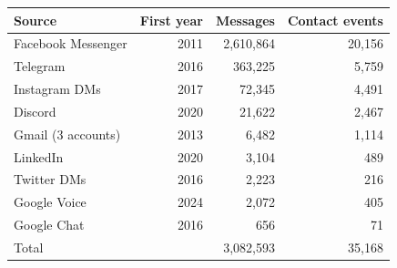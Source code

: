 \begin{tabular}{lrrr}\toprule
Source & First year & Messages & Contact events\\\midrule
Facebook Messenger & 2011 & 2,610,864 & 20,156\\
Telegram & 2016 & 363,225 & 5,759\\
Instagram DMs & 2017 & 72,345 & 4,491\\
Discord & 2020 & 21,622 & 2,467\\
Gmail (3 accounts) & 2013 & 6,482 & 1,114\\
LinkedIn & 2020 & 3,104 & 489\\
Twitter DMs & 2016 & 2,223 & 216\\
Google Voice & 2024 & 2,072 & 405\\
Google Chat & 2016 & 656 & 71\\
\midrule
Total & & 3,082,593 & 35,168\\\bottomrule
\end{tabular}
